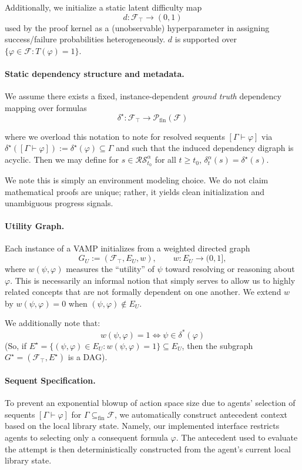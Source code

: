 \documentclass[letterpaper]{article} %
\renewcommand{\phi}{\varphi}
\newcommand{\proves}{\vdash}
\begin{document}
Additionally, we initialize a static latent difficulty map
\[
d:\mathcal F_\top\to (0,1)
\]
used by the proof kernel as a (unobservable) hyperparameter in assigning success/failure probabilities heterogeneously. $d$ is supported over $\{\phi \in \mathcal F : T(\phi)=1\}$.




\paragraph{Static dependency structure and metadata.}
We assume there exists a fixed, instance-dependent \emph{ground truth} dependency mapping over formulas
\[
\delta^\star : \mathcal{F}_\top\to \mathcal{P}_{\mathrm{fin}}(\mathcal{F})
\]

where we overload this notation to note for resolved sequents $[\Gamma \proves \phi]$ via $\delta^\star([\Gamma \proves \phi]) := \delta^\star(\phi) \subseteq \Gamma$ and such that the induced dependency digraph is acyclic. Then we may define for $s \in \mathcal{RS}_{t_0}^\alpha$ for all $t \ge t_0$, $\delta^\alpha_t(s) = \delta^\star(s)$.

We note this is simply an environment modeling choice. We do not claim mathematical proofs are unique; rather, it yields clean initialization and unambiguous progress signals.

\paragraph{Utility Graph.}
Each instance of a VAMP initializes from a weighted directed graph
\[
G_U := (\mathcal F_\top, E_U, w),\qquad w:E_U\to(0,1],
\]
where $w(\psi,\phi)$ measures the ``utility'' of $\psi$ toward resolving or reasoning about $\phi$. This is necessarily an informal notion that simply serves to allow us to highly related concepts that are not formally dependent on one another. We extend $w$ by $w(\psi,\phi)=0$ when $(\psi, \phi)\notin E_U$.

We additionally note that:
\[w(\psi, \phi)=1 \iff \psi \in \delta^*(\phi)\]
(So, if $E^\star = \{(\psi,\phi) \in E_U : w(\psi,\phi)=1\} \subseteq E_U$, then the subgraph $G^\star = (\mathcal{F}_\top,E^\star)$ is a DAG).


\paragraph{Sequent Specification.}
To prevent an exponential blowup of action space size due to agents' selection of sequents $[\Gamma \proves \phi]$ for $\Gamma \subseteq_{\mathrm{fin}} \mathcal{F}$, we automatically construct antecedent context based on the local library state. Namely, our implemented interface restricts agents to selecting only a consequent formula $\phi$. The antecedent used to evaluate the attempt is then deterministically constructed from the agent's current local library state.
\end{document}
